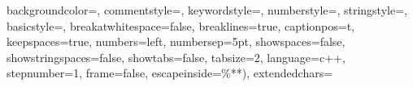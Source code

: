 \usepackage{xcolor}
\usepackage{listings}  %


{
	backgroundcolor=\color{backcolour},%
	commentstyle=\color{codegreen},
	keywordstyle=\color{magenta},
	numberstyle=\small\color{codegray},%
	stringstyle=\color{codepurple},
	basicstyle=\ttfamily\footnotesize, %
	breakatwhitespace=false,           %
	breaklines=true,                   %
	captionpos=t,                      %
	keepspaces=true,                 
	numbers=left,                   %
	numbersep=5pt,                  %
	showspaces=false,               %
	showstringspaces=false,         %
	showtabs=false,                 %
	tabsize=2,                      %
	language=c++,                   %
	stepnumber=1,                   %
	frame=false,                    %
	escapeinside={\%*}{*)},         %
	extendedchars=\true
}

\lstset{style=cpp}